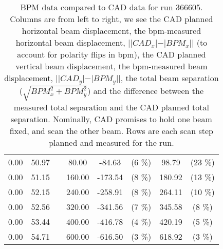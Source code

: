 \begin{table}
\begin{tabular}{c c c c c c c c}
0.00 & 50.97 &  & 80.00 & -84.63 &  (6 \%) & 98.79 &  (23 \%)\\
0.00 & 51.15 &  & 160.00 & -173.54 &  (8 \%) & 180.92 &  (13 \%)\\
0.00 & 52.15 &  & 240.00 & -258.91 &  (8 \%) & 264.11 &  (10 \%)\\
0.00 & 52.56 &  & 320.00 & -341.56 &  (7 \%) & 345.58 &  (8 \%)\\
0.00 & 53.44 &  & 400.00 & -416.78 &  (4 \%) & 420.19 &  (5 \%)\\
0.00 & 54.71 &  & 600.00 & -616.50 &  (3 \%) & 618.92 &  (3 \%)\\
\bottomrule
\end{tabular}
\caption{ BPM data compared to CAD data for run 366605. Columns are from left to right, we see the CAD planned horizontal beam displacement, the bpm-measured horizontal beam displacement, $||CAD_{x}| - |BPM_{x}||$ (to account for polarity flips in bpm), the CAD planned vertical beam displacement, the bpm-measured beam displacement, $||CAD_{y}| - |BPM_{y}||$, the total beam separation ($\sqrt{BPM_{x}^2+BPM_{y}^2}$) and the difference between the measured total separation and the CAD planned total separation. Nominally, CAD promises to hold one beam fixed, and scan the other beam. Rows are each scan step planned and measured for the run. }
\label{0xffdb500c}
\end{table}
